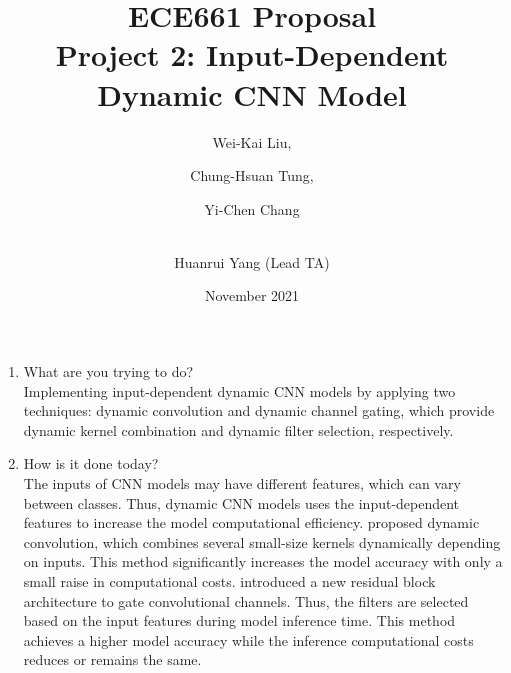 \documentclass[10pt, journal, onecolumn]{IEEEtran}
\title{ECE661 Proposal \\
       Project 2: Input-Dependent Dynamic CNN Model}
\author{Wei-Kai Liu,      \and
        Chung-Hsuan Tung, \and
        Yi-Chen Chang     \and
        \\Huanrui Yang (Lead TA)}
\date{November 2021}
\begin{document}
\maketitle

\vspace{-20pt}
\begin{enumerate}
\large
    \item What are you trying to do?\\
    Implementing input-dependent dynamic CNN models by applying two techniques: dynamic convolution and dynamic channel gating, which provide dynamic kernel combination and dynamic filter selection, respectively.
    \item How is it done today?\\
    The inputs of CNN models may have different features, which can vary between classes. Thus, dynamic CNN models uses the input-dependent features to increase the model computational efficiency. \cite{chen2020dynamic} proposed dynamic convolution, which combines several small-size kernels dynamically depending on inputs. This method significantly increases the model accuracy with only a small raise in computational costs. \cite{Bejnordi2020Batch-shaping} introduced a new residual block architecture to  gate convolutional channels. Thus, the filters are selected based on the input features during model inference time. This method  achieves a higher model accuracy while the inference computational costs reduces or remains the same.
    

\end{enumerate}
\end{document}
